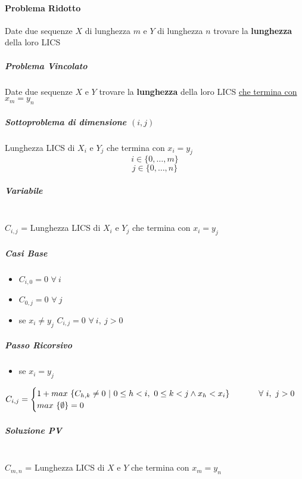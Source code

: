 \documentclass[12pt]{article}
\begin{document}
\paragraph{Problema Ridotto}
Date due sequenze $X$ di lunghezza $m$ e $Y$ di lunghezza $n$ trovare la \textbf{lunghezza} della loro LICS
\subparagraph{Problema Vincolato}
Date due sequenze $X$ e $Y$ trovare la \textbf{lunghezza} della loro LICS \underline{che termina con $x_m = y_n$}
\subparagraph{Sottoproblema di dimensione $(i, j)$}
Lunghezza LICS di $X_i$ e $Y_j$ che termina con $x_i = y_j$
$$i \in \{0, \dots, m\}$$
$$j \in \{0, \dots, n\}$$
\subparagraph{Variabile}\mbox{}\\
$C_{i, j}$ = Lunghezza LICS di $X_i$ e $Y_j$ che termina con $x_i = y_j$
\subparagraph{Casi Base}
\begin{itemize}
    \item $C_{i,0} = 0$ \hspace{1cm} $\forall \ i$
    \item $C_{0,j} = 0$ \hspace{1cm} $\forall \ j$
    \item se $x_i \neq y_j$ \hspace{1cm} $C_{i,j} = 0$ \hspace{1cm} $\forall \ i, \ j > 0$
\end{itemize}
\subparagraph{Passo Ricorsivo}
\begin{itemize}
    \item se $x_i = y_j$
\end{itemize}
\[
    C_{i,j}=\begin{cases}
        1 + max \ \{C_{h,k}\neq 0 \ | \ 0\leq h<i, \ 0\leq k<j \land x_h < x_i\}$ \hspace{1cm} $\forall \ i, \ j > 0 \\
        max \ \{\emptyset\} = 0
    \end{cases}
\]
\subparagraph{Soluzione PV}\mbox{}\\
$C_{m, n}$ = Lunghezza LICS di $X$ e $Y$ che termina con $x_m = y_n$
\end{document}
